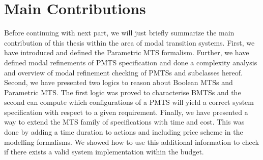 \section{Main Contributions}
Before continuing with next part, we will just briefly summarize the main contribution of this thesis within the area of modal transition systems. First, we have introduced and defined the Parametric MTS formalism. Further, we have defined modal refinements of PMTS specification and done a complexity analysis and overview of modal refinement checking of PMTSs and subclasses hereof. Second, we have presented two logics to reason about Boolean MTSs and Parametric MTS. The first logic was proved to characterise BMTSs and the second can compute which configurations of a PMTS will yield a correct system specification with respect to a given requirement. Finally, we have presented a way to extend the MTS family of specifications with time and cost. This was done by adding a time duration to actions and including price scheme in the modelling formalisms. We showed how to use this additional information to check if there exists a valid system implementation within the budget.
